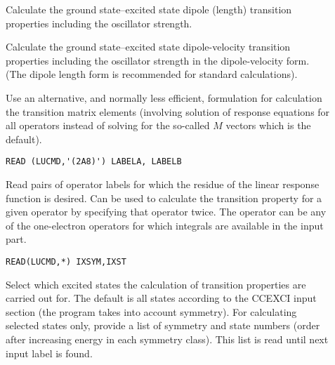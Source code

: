 \begin{description}
\item[] 

Calculate the ground state--excited state dipole (length) transition properties including
the oscillator strength.

\item[] 

Calculate the ground state--excited state dipole-velocity  transition properties including
the oscillator strength in the dipole-velocity form. (The dipole length form is recommended
for standard calculations).

\item[] 
 
Use an alternative, and normally less efficient, formulation for calculation
the transition matrix elements (involving solution of response equations for 
all operators instead of solving for the so-called $M$ vectors which is the default).

\item[] 

\noindent\verb|READ (LUCMD,'(2A8)') LABELA, LABELB|\newline

Read pairs of operator labels for which the residue of the linear response function is desired.
Can be used to calculate the transition property for a given operator
by specifying that operator twice. The operator can be any of the one-electron
operators for which integrals are available in the  input part.




\item[] 

\noindent\verb|READ(LUCMD,*) IXSYM,IXST|
 
Select which excited states the calculation of transition properties
are carried out for. The default is all states according to the CCEXCI input section
(the program takes into account symmetry). For calculating selected states only,
provide a list of symmetry and state numbers (order after increasing energy in 
each symmetry class). This list is read until next input label is found.



\end{description}
